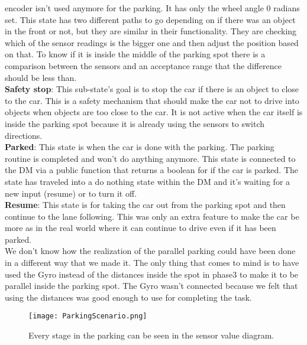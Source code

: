 encoder isn't used anymore for the parking. It has only the wheel angle 0
radians set. This state has two different paths to go depending on if there was
an object in the front or not, but they are similar in their functionality. They
are checking which of the sensor readings is the bigger one and then adjust the
position based on that. To know if it is inside the middle of the parking spot
there is a comparison between the sensors and an acceptance range that the
difference should be less than.\\
\textbf{Safety stop}: This sub-state's goal is to stop the car if there is an
object to close to the car. This is a safety mechanism that should make the car
not to drive into objects when objects are too close to the car. It is not
active when the car itself is inside the parking spot because it is already
using the sensors to switch directions.\\

\noindent
\textbf{Parked}: This state is when the car is done with the parking. The
parking routine is completed and won't do anything anymore. This state is
connected to the DM via a public function that returns a boolean for if the car
is parked. The state has traveled into a do nothing state within the DM and it's
waiting for a new input (resume) or to turn it off.\\

\noindent
\textbf{Resume}: This state is for taking the car out from the parking spot and
then continue to the lane following. This was only an extra feature to make the
car be more as in the real world where it can continue to drive even if it has
been parked.\\

\noindent
We don't know how the realization of the parallel parking could have been done
in a different way that we made it. The only thing that comes to mind is to have
used the Gyro instead of the distances inside the spot in phase3 to make it to
be parallel inside the parking spot. The Gyro wasn't connected because we felt
that using the distances was good enough to use for completing the task.
\begin{figure}[ht]
  \centering
  \texttt{[image: ParkingScenario.png]}
  \caption{Every stage in the parking can be seen in the sensor value diagram.}
  \label{parkingscen}
\end{figure}